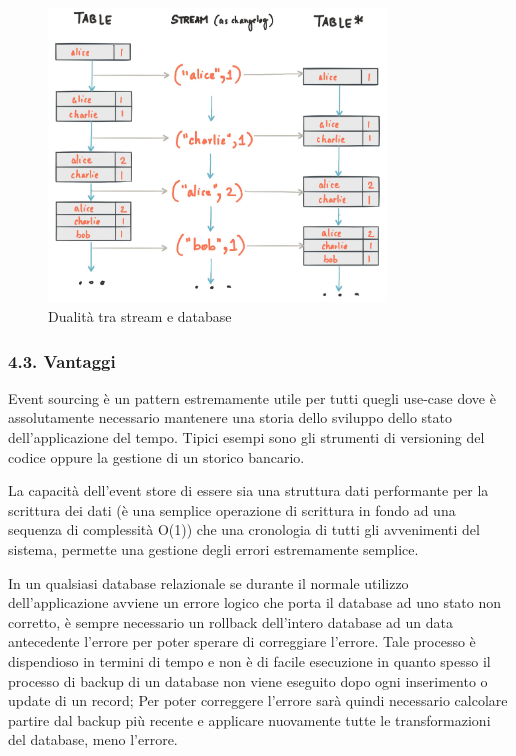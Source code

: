 \documentclass[]{article}
\begin{document}
\begin{figure}
\centering
\includegraphics[width=0.80000\textwidth]{../images/streams-table-duality.jpg}
\caption{Dualità tra stream e database \label{figure_2}}
\end{figure}

\newpage

\subsubsection{4.3. Vantaggi}\label{vantaggi}

Event sourcing è un pattern estremamente utile per tutti quegli use-case
dove è assolutamente necessario mantenere una storia dello sviluppo
dello stato dell'applicazione del tempo. Tipici esempi sono gli
strumenti di versioning del codice oppure la gestione di un storico
bancario.

La capacità dell'event store di essere sia una struttura dati
performante per la scrittura dei dati (è una semplice operazione di
scrittura in fondo ad una sequenza di complessità O(1)) che una
cronologia di tutti gli avvenimenti del sistema, permette una gestione
degli errori estremamente semplice.

In un qualsiasi database relazionale se durante il normale utilizzo
dell'applicazione avviene un errore logico che porta il database ad uno
stato non corretto, è sempre necessario un rollback dell'intero database
ad un data antecedente l'errore per poter sperare di correggiare
l'errore. Tale processo è dispendioso in termini di tempo e non è di
facile esecuzione in quanto spesso il processo di backup di un database
non viene eseguito dopo ogni inserimento o update di un record; Per
poter correggere l'errore sarà quindi necessario calcolare partire dal
backup più recente e applicare nuovamente tutte le transformazioni del
database, meno l'errore.
\end{document}
